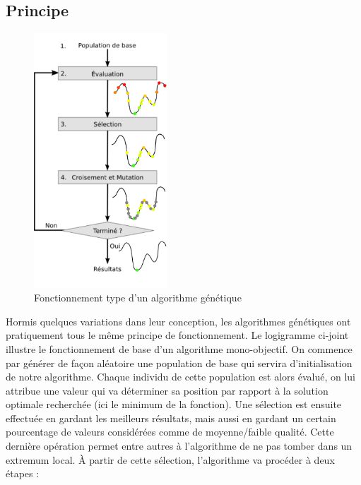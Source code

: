 \documentclass[12pt]{report}
\begin{document}
      \subsection{Principe}
        \begin{figure}
        \centering
        \includegraphics[width=5cm]{img/schema_algo_single.png}
        \caption{Fonctionnement type d'un algorithme génétique}
        \end{figure}
        Hormis quelques variations dans leur conception, les algorithmes génétiques ont pratiquement tous le même principe de fonctionnement.
        Le logigramme ci-joint illustre le fonctionnement de base d'un algorithme mono-objectif.
        On commence par générer de façon aléatoire une population de base qui servira d'initialisation de notre algorithme.
        Chaque individu de cette population est alors évalué, on lui attribue une valeur qui va déterminer sa position par rapport à la solution optimale recherchée (ici le minimum de la fonction).
        Une sélection est ensuite effectuée en gardant les meilleurs résultats, mais aussi en gardant un certain pourcentage de valeurs considérées comme de moyenne/faible qualité. Cette dernière opération permet entre autres à l'algorithme de ne pas tomber dans un extremum local.
        À partir de cette sélection, l'algorithme va procéder à deux étapes :
\end{document}
